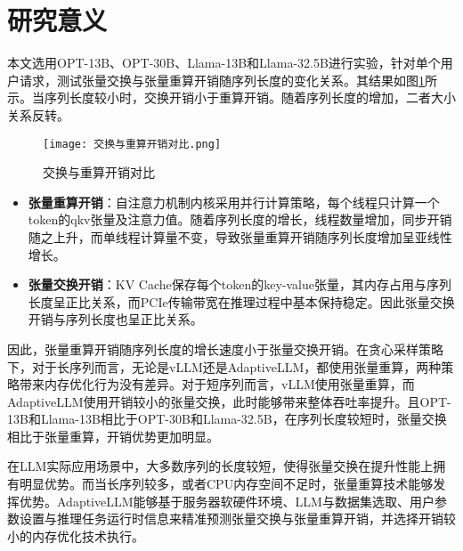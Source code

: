 \section{研究意义}

本文选用OPT-13B、OPT-30B、Llama-13B和Llama-32.5B进行实验，针对单个用户请求，测试张量交换与张量重算开销随序列长度的变化关系。其结果如图\ref{Fig:交换与重算开销对比}所示。当序列长度较小时，交换开销小于重算开销。随着序列长度的增加，二者大小关系反转。

\begin{figure}[!htbp]
    \centering
    \texttt{[image: 交换与重算开销对比.png]}
    \caption{交换与重算开销对比}
    \label{Fig:交换与重算开销对比}
  \end{figure}

\begin{itemize}    
    \item \textbf{张量重算开销}：自注意力机制内核采用并行计算策略，每个线程只计算一个token的qkv张量及注意力值。随着序列长度的增长，线程数量增加，同步开销随之上升，而单线程计算量不变，导致张量重算开销随序列长度增加呈亚线性增长。
    \item \textbf{张量交换开销}：KV Cache保存每个token的key-value张量，其内存占用与序列长度呈正比关系，而PCIe传输带宽在推理过程中基本保持稳定。因此张量交换开销与序列长度也呈正比关系。
\end{itemize}

因此，张量重算开销随序列长度的增长速度小于张量交换开销。在贪心采样策略下，对于长序列而言，无论是vLLM还是AdaptiveLLM，都使用张量重算，两种策略带来内存优化行为没有差异。对于短序列而言，vLLM使用张量重算，而AdaptiveLLM使用开销较小的张量交换，此时能够带来整体吞吐率提升。且OPT-13B和Llama-13B相比于OPT-30B和Llama-32.5B，在序列长度较短时，张量交换相比于张量重算，开销优势更加明显。

在LLM实际应用场景中，大多数序列的长度较短，使得张量交换在提升性能上拥有明显优势。而当长序列较多，或者CPU内存空间不足时，张量重算技术能够发挥优势。AdaptiveLLM能够基于服务器软硬件环境、LLM与数据集选取、用户参数设置与推理任务运行时信息来精准预测张量交换与张量重算开销，并选择开销较小的内存优化技术执行。 
